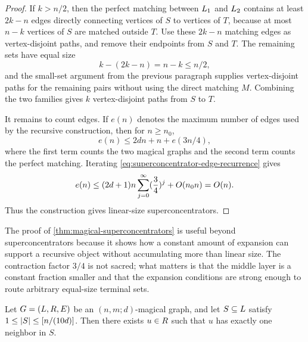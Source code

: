 \begin{proof}
	If \(k>n/2\), then the perfect matching between \(L_1\) and \(L_2\) contains at least \(2k-n\) edges directly connecting vertices of \(S\) to vertices of \(T\), because at most \(n-k\) vertices of \(S\) are matched outside \(T\). Use these \(2k-n\) matching edges as vertex-disjoint paths, and remove their endpoints from \(S\) and \(T\). The remaining sets have equal size
	\begin{equation}
		\label{eq:superconcentrator-large-reduction}
		k-(2k-n)=n-k\leq n/2,
	\end{equation}
	and the small-set argument from the previous paragraph supplies vertex-disjoint paths for the remaining pairs without using the direct matching \(M\). Combining the two families gives \(k\) vertex-disjoint paths from \(S\) to \(T\).

	It remains to count edges. If \(e(n)\) denotes the maximum number of edges used by the recursive construction, then for \(n\geq n_0\),
	\begin{equation}
		\label{eq:superconcentrator-edge-recurrence}
		e(n)\leq 2dn+n+e(3n/4),
	\end{equation}
	where the first term counts the two magical graphs and the second term counts the perfect matching. Iterating \cref{eq:superconcentrator-edge-recurrence} gives
	\begin{equation}
		\label{eq:superconcentrator-edge-solution}
		e(n)\leq (2d+1)n\sum_{j=0}^{\infty}\left(\frac{3}{4}\right)^j+\bigO(n_0 n)
		=\bigO(n).
	\end{equation}
	Thus the construction gives linear-size superconcentrators.
\end{proof}

The proof of \cref{thm:magical-superconcentrators} is useful beyond superconcentrators because it shows how a constant amount of expansion can support a recursive object without accumulating more than linear size. The contraction factor \(3/4\) is not sacred; what matters is that the middle layer is a constant fraction smaller and that the expansion conditions are strong enough to route arbitrary equal-size terminal sets.

\begin{lemma}
	\label{lem:magical-unique-neighbor}
	Let \(G=(L,R,E)\) be an \((n,m;d)\)-magical graph, and let \(S\subseteq L\) satisfy \(1\leq\lvert S\rvert\leq [ n/(10d)]\). Then there exists \(u\in R\) such that \(u\) has exactly one neighbor in \(S\).
\end{lemma}


